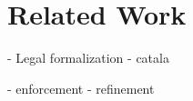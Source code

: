 \chapter{Related Work}
\label{chapter:related-work}

- Legal formalization
    - catala

- enforcement
- refinement
